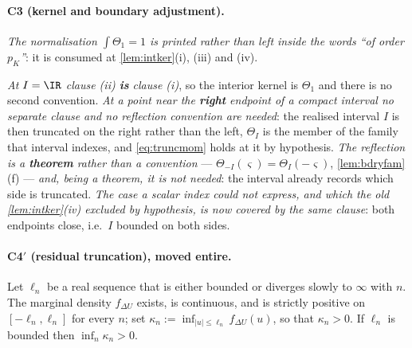 \paragraph{C3 (kernel and boundary adjustment).}

\emph{The normalisation $\int\Theta_1=1$ is printed rather than left inside the words ``of order
$p_K$''}: it is consumed at \cref{lem:intker}(i), (iii) and (iv).

\medskip
\noindent
\emph{At $I=\IR$ clause (ii) \textbf{is} clause (i)}, so the interior kernel is $\Theta_1$ and there is
no second convention. \emph{At a point near the \textbf{right} endpoint of a compact interval no
separate clause and no reflection convention are needed}: the realised interval $I$ is then truncated
on the right rather than the left, $\Theta_I$ is the member of the family that interval indexes, and
\eqref{eq:truncmom} holds at it by hypothesis. \emph{The reflection is a
\textbf{theorem} rather than a convention} --- $\Theta_{-I}(\varsigma)=\Theta_I(-\varsigma)$,
\cref{lem:bdryfam}(f) --- \emph{and, being a theorem, it is not needed}: the interval already records
which side is truncated. \emph{The case a scalar index could not express, and which the old
\cref{lem:intker}(iv) excluded by hypothesis, is now covered by the same clause}: both endpoints close,
i.e.\ $I$ bounded on both sides.

\paragraph{C4$'$ (residual truncation), moved entire.}

\begin{assumption}\label{ass:app4}
Let $\ell_n$ be a real sequence that is either bounded or diverges slowly to $\infty$ with $n$. The
marginal density $f_{\Delta U}$ exists, is continuous, and is strictly positive on $[-\ell_n,\ell_n]$
for every $n$; set $\kappa_n:=\inf_{|u|\le\ell_n}f_{\Delta U}(u)$, so that $\kappa_n>0$. If $\ell_n$ is
bounded then $\inf_n\kappa_n>0$.
\end{assumption}

